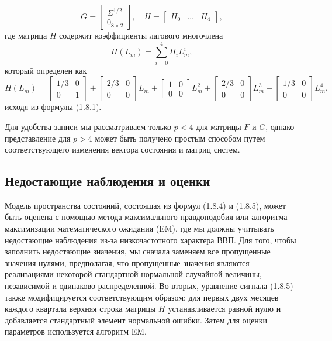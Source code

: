 \documentclass[a4paper, 14pt]{extreport}
\numberwithin{equation}{subsection}
\numberwithin{equation}{section}
\begin{document}
	\begin{equation}
		G = \begin{bmatrix}
		\Sigma^{1/2}\\ 0_{8\times2}
	\end{bmatrix},\quad H = \begin{bmatrix}
		H_0 & \ldots & H_4
	\end{bmatrix},
	\end{equation}
	где матрица $H$ содержит коэффициенты лагового многочлена \begin{equation}
		H(L_m) = \sum_{i=0}^{4}H_iL_m^i,
	\end{equation}
	который определен как 
	\begin{equation}
		H(L_m) = \begin{bmatrix}
		1/3 & 0 \\ 0 & 1
	\end{bmatrix} + \begin{bmatrix}
		2/3 & 0\\
		0 & 0
	\end{bmatrix} L_m + \begin{bmatrix}
		1 & 0\\
		0 & 0
	\end{bmatrix}L_m^2 + \begin{bmatrix}
		2/3 & 0\\
		0 & 0
	\end{bmatrix}L_m^3 + \begin{bmatrix}
		1/3 & 0 \\ 0 & 0
	\end{bmatrix}L_m^4,
	\end{equation}
	исходя из формулы (1.8.1).
	
	Для удобства записи мы рассматриваем
	только $p<4$ для матрицы $F$ и $G$, однако представление для $p > 4$ может быть получено простым способом путем соответствующего изменения вектора состояния и матриц систем.
	\subsection{Недостающие наблюдения и оценки}
	Модель пространства состояний, состоящая из формул (1.8.4) и (1.8.5), может быть оценена с помощью метода максимального правдоподобия или алгоритма максимизации математического ожидания (EM), где мы должны учитывать недостающие наблюдения из-за низкочастотного характера ВВП. Для того, чтобы заполнить недостающие значения, мы сначала заменяем все пропущенные значения нулями, предполагая, что пропущенные значения являются реализациями некоторой стандартной нормальной случайной величины, независимой и одинаково распределенной. Во-вторых, уравнение сигнала (1.8.5) также модифицируется соответствующим образом: для первых двух месяцев каждого квартала верхняя строка матрицы $H$ устанавливается равной нулю и добавляется стандартный элемент нормальной ошибки. Затем для оценки параметров используется алгоритм EM.
	
\end{document}
